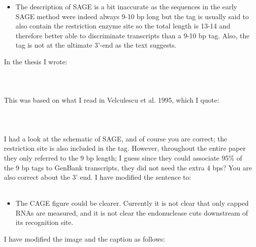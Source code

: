\documentclass[10pt,a4paper,sans]{article}
\begin{document}
\begin{itemize}
   \item{The description of SAGE is a bit inaccurate as the sequences in the early SAGE method were indeed always 9-10 bp long but the tag is usually said to also contain the restriction enzyme site so the total length is 13-14 and therefore better able to discriminate transcripts than a 9-10 bp tag. Also, the tag is not at the ultimate 3’-end as the text suggests.}
\end{itemize}
\noindent
In the thesis I wrote:
\\\\
\\\\
This was based on what I read in Velculescu et al. 1995, which I quote:
\\\\
\\\\
I had a look at the schematic of SAGE, and of course you are correct; the restriction site is also included in the tag. However, throughout the entire paper they only referred to the 9 bp length; I guess since they could associate 95\% of the 9 bp tags to GenBank transcripts, they did not need the extra 4 bps? You are also correct about the 3' end. I have modified the sentence to:
\\\\

\begin{itemize}
   \item{The CAGE figure could be clearer. Currently it is not clear that only capped RNAs are measured, and it is not clear the endonuclease cuts downstream of its recognition site.}
\end{itemize}

\noindent
I have modified the image and the caption as follows:
\end{document}
